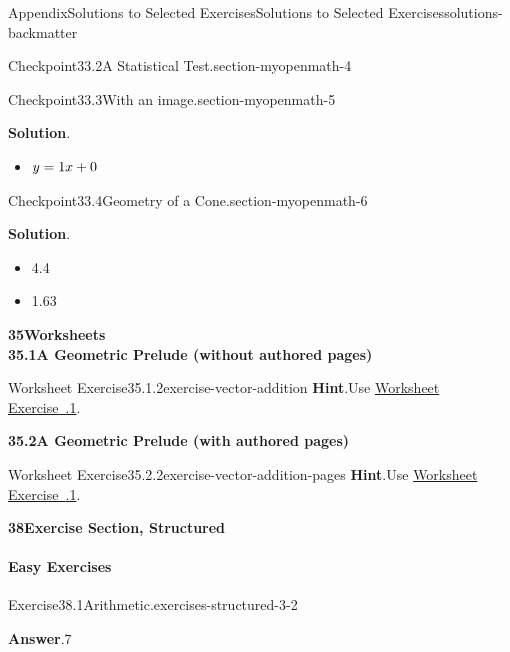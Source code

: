 \documentclass[twoside,10pt,]{article}
\newcommand{\blocktitlefont}{\relax}
\newcommand{\xreffont}{\relax}
\numberwithin{equation}{section}
\begin{document}
\begin{solutions-section}{Appendix}{Solutions to Selected Exercises}{}{Solutions to Selected Exercises}{}{}{solutions-backmatter}
\begin{inlinesolution}{Checkpoint}{33.2}{A Statistical Test.}{section-myopenmath-4}
\begin{itemize}[label=\textbullet]
\end{itemize}
%
\end{inlinesolution}%
\begin{inlinesolution}{Checkpoint}{33.3}{With an image.}{section-myopenmath-5}%
\par\smallskip%
\noindent\textbf{\blocktitlefont Solution}.\hypertarget{section-myopenmath-5-3-back}{}\quad{}%
\begin{itemize}[label=\textbullet]
\item{}\(\displaystyle \displaystyle{y}={1}{x}+{0}\)%
\end{itemize}
%
\end{inlinesolution}%
\begin{inlinesolution}{Checkpoint}{33.4}{Geometry of a Cone.}{section-myopenmath-6}%
\par\smallskip%
\noindent\textbf{\blocktitlefont Solution}.\hypertarget{section-myopenmath-6-3-back}{}\quad{}%
\begin{itemize}[label=\textbullet]
\item{}4.4%
\item{}1.63%
\end{itemize}
%
\end{inlinesolution}%
\par\medskip
\noindent\textbf{\large{}35\space\textperiodcentered\space{}Worksheets\\
35.1\space\textperiodcentered\space{}A Geometric Prelude (without authored pages)}
\begin{divisionsolution}{Worksheet Exercise}{35.1.2}{}{exercise-vector-addition}%
\noindent\textbf{\blocktitlefont Hint}.\hypertarget{exercise-vector-addition-2-back}{}\quad{}Use \hyperlink{ex-cyclic}{Worksheet Exercise~{\xreffont 35.1.1}}.%
\end{divisionsolution}%
\par\medskip
\noindent\textbf{\large{}35.2\space\textperiodcentered\space{}A Geometric Prelude (with authored pages)}
\begin{divisionsolution}{Worksheet Exercise}{35.2.2}{}{exercise-vector-addition-pages}%
\noindent\textbf{\blocktitlefont Hint}.\hypertarget{exercise-vector-addition-pages-2-back}{}\quad{}Use \hyperlink{ex-cyclic}{Worksheet Exercise~{\xreffont 35.1.1}}.%
\end{divisionsolution}%
\par\medskip
\noindent\textbf{\large{}38\space\textperiodcentered\space{}Exercise Section, Structured}
\paragraph[{Easy Exercises}]{Easy Exercises}
\begin{divisionsolution}{Exercise}{38.1}{Arithmetic.}{exercises-structured-3-2}%
\par\smallskip%
\noindent\textbf{\blocktitlefont Answer}.\hypertarget{exercises-structured-3-2-3-back}{}\quad{}\(7\)%
\end{divisionsolution}%
\par\medskip\noindent

\end{solutions-section}
\end{document}
